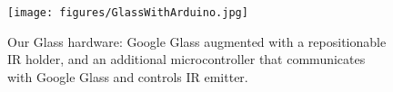




\begin{figure}[t]
\centering
\texttt{[image: figures/GlassWithArduino.jpg]}
\caption{Our Glass hardware: Google Glass augmented with a repositionable IR holder, and an additional microcontroller that communicates with Google Glass and controls IR emitter.}
\label{fig:glass}
\end{figure}

